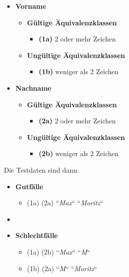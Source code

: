 \begin{itemize}
    \item \textbf{Vorname}
    \begin{itemize}
        \item \textbf{Gültige Äquivalenzklassen}
        \begin{itemize}
            \item[] \textbf{(1a)} 2 oder mehr Zeichen
        \end{itemize}
        \item \textbf{Ungültige Äquivalenzklassen}
        \begin{itemize}
            \item[] \textbf{(1b)} weniger als 2 Zeichen
        \end{itemize}
    \end{itemize}
    \item \textbf{Nachname}
    \begin{itemize}
        \item \textbf{Gültige Äquivalenzklassen}
        \begin{itemize}
            \item[] \textbf{(2a)} 2 oder mehr Zeichen
        \end{itemize}
        \item \textbf{Ungültige Äquivalenzklassen}
        \begin{itemize}
            \item[] \textbf{(2b)} weniger als 2 Zeichen
        \end{itemize}
    \end{itemize}
\end{itemize}

\noindent
Die Testdaten sind dann:

\begin{itemize}
    \item \textbf{Gutfälle}
    \begin{itemize}
        \item[] (1a) (2a) ``\textit{Max}`` ``\textit{Moritz}``
    \end{itemize}
    \item \item \textbf{Schlechtfälle}
    \begin{itemize}
        \item[] (1a) (2b) ``\textit{Max}`` ``\textit{M}``
        \item[] (1b) (2a) ``\textit{M}`` ``\textit{Moritz}``
    \end{itemize}
\end{itemize}

